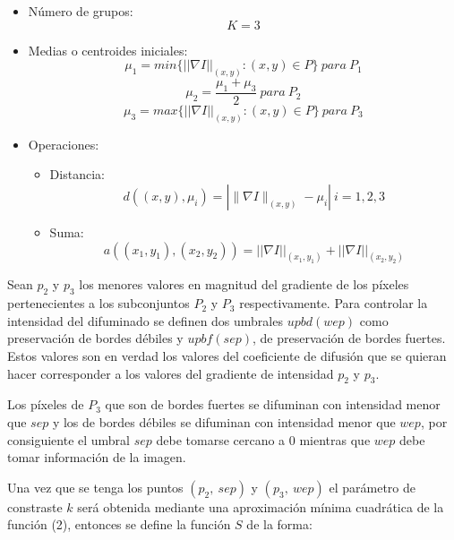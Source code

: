 \documentclass[a4paper,10pt,twocolumn]{article}
\begin{document}
\begin{itemize} 
\item {N\'umero de grupos:
	\begin{equation}
		K = 3
	\end{equation}}
\item {Medias o centroides iniciales:
	\begin{equation}
		\mu_1 = min \{||\nabla I||_{(x,y)} : (x,y) \in P\}\ para\ P_1
	\end{equation}
	\begin{equation}
		\mu_2 = \frac{\mu_1 + \mu_3}{2}\ para\ P_2
	\end{equation}
	\begin{equation}
		\mu_3 = max \{||\nabla I||_{(x,y)} : (x,y) \in P\}\ para\ P_3
	\end{equation}}
\item {Operaciones: \\
	\begin{itemize} 
		\item {Distancia: 
			\begin{equation}
				d((x,y), \mu_i) = \left| \parallel \nabla I \parallel_{(x,y)} - \mu_i \right|\  i=1,2,3
			\end{equation}}
		\item {Suma:
			\begin{equation}
				a((x_1,y_1), (x_2,y_2)) = ||\nabla I||_{(x_1,y_1)} + ||\nabla I||_{(x_2,y_2)}
			\end{equation}}
	\end{itemize}}
\end{itemize}

Sean $p_2$ y $p_3$ los menores valores en magnitud del gradiente de los p\'ixeles pertenecientes a los subconjuntos $P_2$ y $P_3$  respectivamente. Para controlar la intensidad del difuminado se definen dos umbrales $upbd(wep)$ como preservaci\'on de bordes d\'ebiles y $upbf(sep)$, de preservaci\'on de bordes fuertes. Estos valores son en verdad los valores del coeficiente de difusi\'on que se quieran hacer corresponder a los valores del gradiente de intensidad $p_2$ y $p_3$.

Los p\'ixeles de $P_3$ que son de bordes fuertes se difuminan con intensidad menor que $sep$ y los de bordes d\'ebiles se difuminan con intensidad menor que $wep$, por consiguiente el umbral $sep$ debe tomarse cercano a 0 mientras que $wep$ debe tomar informaci\'on de la imagen.

Una vez que se tenga los puntos $(p_2,\ sep)$ y $(p_3,\ wep)$ el par\'ametro de constraste $k$ ser\'a obtenida mediante una aproximaci\'on m\'inima cuadr\'atica de la funci\'on (2), entonces se define la funci\'on $S$ de la forma:
\end{document}
